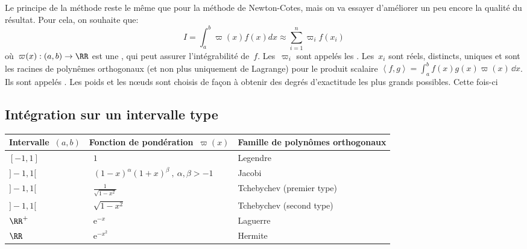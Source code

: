 Le principe de la méthode reste le même que pour la méthode de Newton-Cotes, mais
on va essayer d'améliorer un peu encore la qualité du résultat.
Pour cela, on souhaite que:
\begin{equation}I=\int_a^b \varpi(x)f(x)dx \approx \sum_{i=1}^n \varpi_if(x_i)\end{equation}
où~$\varpi(x): (a,b)\rightarrow\RR$ est une , 
qui peut assurer l'intégrabilité de~$f$. 
Les~$\varpi_i$ sont appelés les .
Les~$x_i$ sont réels, distincts, uniques et sont les racines de polynêmes orthogonaux 
(et non plus uniquement de Lagrange) pour le produit scalaire 
$\left\langle f,g \right\rangle = \int_a^b f(x)g(x) \varpi(x) \,\dd x$. 
Ils sont appelés .
Les poids et les nœuds sont choisis de façon à obtenir des degrés d'exactitude les plus 
grands possibles.
Cette fois-ci 

\medskip
\subsection*{Intégration sur un intervalle type}


\begin{center}
\begin{tabular}{lll}
Intervalle~$(a,b)$ & Fonction de pondération~$\varpi(x)$ & Famille de polynômes orthogonaux\\
\hline
$[-1,1]$ &~$1$ & Legendre\\
$]-1,1[$ &~$(1-x)^\alpha (1+x)^\beta \ , \ \alpha, \beta > -1$ & Jacobi\\
$]-1,1[$ &~$\frac{1}{\sqrt{1-x^2}}$ &Tchebychev (premier type)\\
$]-1,1[$ &~$\sqrt{1-x^2}$ & Tchebychev (second type)\\
$\RR^+$ &~$\mathrm{e}^{-x}$ & Laguerre\\
$\RR$ &~$\mathrm{e}^{-x^2}$ & Hermite\\
\end{tabular}
\end{center}

